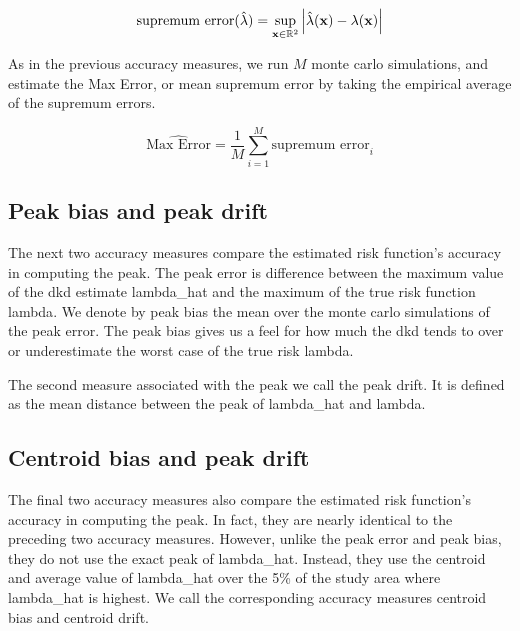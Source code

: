 \begin{equation}
    \mbox{supremum error}(\hat{\lambda}) = \sup_{\mathbf{x} \in \mathbb{R}^2} {\left| \hat{\lambda}(\mathbf{x}) - \lambda(\mathbf{x}) \right|}
\end{equation}

As in the previous accuracy measures, we run \(M\) monte carlo simulations, and estimate the Max Error, or mean supremum error by taking the empirical average of the supremum errors.

\begin{equation}
    \hat{\mbox{Max Error}} = \frac{1}{M} \sum_{i=1}^{M} \mbox{supremum error}_i
\end{equation}

\subsection{Peak bias and peak drift}
\label{subsec:method:peak_bias}

The next two accuracy measures compare the estimated risk function's accuracy in computing the peak.
The \gls{peak error} is difference between the maximum value of the \gls{dkd} estimate \gls{lambda_hat} and the maximum of the true risk function \gls{lambda}.
We denote by \gls{peak bias} the mean over the monte carlo simulations of the \gls{peak error}.
The \gls{peak bias} gives us a feel for how much the \gls{dkd} tends to over or underestimate the worst case of the true risk \gls{lambda}.

The second measure associated with the peak we call the \gls{peak drift}.
It is defined as the mean distance between the peak of \gls{lambda_hat} and \gls{lambda}.

\subsection{Centroid bias and peak drift}
\label{subsec:method:centroid_bias}

The final two accuracy measures also compare the estimated risk function's accuracy in computing the peak.
In fact, they are nearly identical to the preceding two accuracy measures.
However, unlike the \gls{peak error} and \gls{peak bias}, they do not use the exact peak of \gls{lambda_hat}.
Instead, they use the centroid and average value of \gls{lambda_hat} over the 5\% of the study area where \gls{lambda_hat} is highest.
We call the corresponding accuracy measures \gls{centroid bias} and \gls{centroid drift}.

